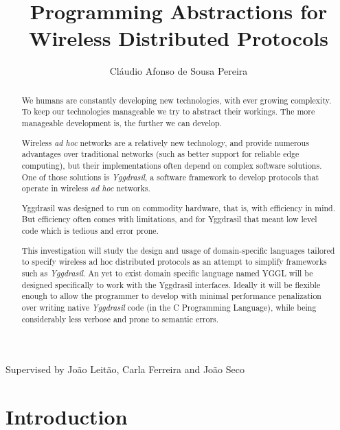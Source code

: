 \documentclass[runningheads]{llncs}
\begin{document}
\title{Programming Abstractions for Wireless Distributed Protocols}
\author{Cláudio Afonso de Sousa Pereira}

\maketitle

\begin{center} Supervised by João Leitão, Carla Ferreira and João Seco \end{center}
\begin{abstract}
We humans are constantly developing new technologies, with ever growing complexity.
To keep our technologies manageable we try to abstract their workings. The more manageable development is, the further we can develop.
\par Wireless \textit{ad hoc} networks are a relatively new technology, and provide numerous advantages over traditional networks (such as better support for reliable edge computing), but their implementations often depend on complex software solutions. One of those solutions is \textit{Yggdrasil}, a software framework to develop protocols that operate in wireless \textit{ad hoc} networks.
\par Yggdrasil was designed to run on commodity hardware, that is, with efficiency in mind. But efficiency often comes with limitations, and for Yggdrasil that meant low level code which is tedious and error prone.
\par This investigation will study the design and usage of domain-specific languages tailored to specify wireless ad hoc distributed protocols as an attempt to simplify frameworks such as \textit{Yggdrasil}.
An yet to exist domain specific language named YGGL will be designed specifically to work with the Yggdrasil interfaces.
Ideally it will be flexible enough to allow the programmer to develop with minimal performance penalization over writing native \textit{Yggdrasil} code (in the C Programming Language), while being considerably less verbose and prone to semantic errors.
\end{abstract}

\section{Introduction}
\end{document}
